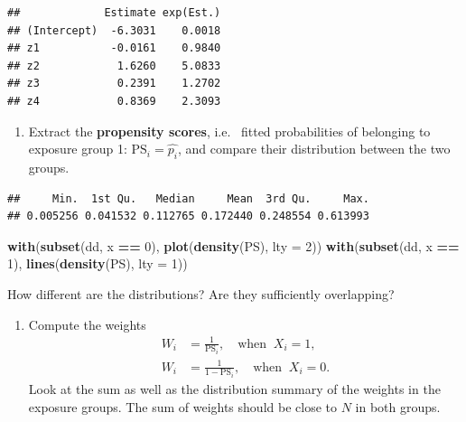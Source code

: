 \documentclass[
]{book}
\newenvironment{Shaded}{\begin{snugshade}}{\end{snugshade}}
\newcommand{\AttributeTok}[1]{\textcolor[rgb]{0.13,0.29,0.53}{#1}}
\newcommand{\DecValTok}[1]{\textcolor[rgb]{0.00,0.00,0.81}{#1}}
\newcommand{\FunctionTok}[1]{\textcolor[rgb]{0.13,0.29,0.53}{\textbf{#1}}}
\newcommand{\NormalTok}[1]{#1}
\newcommand{\OtherTok}[1]{\textcolor[rgb]{0.56,0.35,0.01}{#1}}
\newcommand{\SpecialCharTok}[1]{\textcolor[rgb]{0.81,0.36,0.00}{\textbf{#1}}}
\newcommand{\StringTok}[1]{\textcolor[rgb]{0.31,0.60,0.02}{#1}}
\providecommand{\tightlist}{%
  \setlength{\itemsep}{0pt}\setlength{\parskip}{0pt}}
\begin{document}
\begin{verbatim}
##             Estimate exp(Est.)
## (Intercept)  -6.3031    0.0018
## z1           -0.0161    0.9840
## z2            1.6260    5.0833
## z3            0.2391    1.2702
## z4            0.8369    2.3093
\end{verbatim}

\begin{enumerate}
\def\labelenumi{\arabic{enumi}.}
\setcounter{enumi}{1}
\tightlist
\item
  Extract the \textbf{propensity scores}, i.e.~
  fitted probabilities of
  belonging to exposure group 1:
  \(\text{PS}_i = \widehat{p_i}\), and
  compare their distribution between the two groups.
\end{enumerate}

\begin{Shaded}
\end{Shaded}

\begin{verbatim}
##     Min.  1st Qu.   Median     Mean  3rd Qu.     Max. 
## 0.005256 0.041532 0.112765 0.172440 0.248554 0.613993
\end{verbatim}

\begin{Shaded}
\begin{Highlighting}[]
\FunctionTok{with}\NormalTok{(}\FunctionTok{subset}\NormalTok{(dd, x }\SpecialCharTok{==} \DecValTok{0}\NormalTok{), }\FunctionTok{plot}\NormalTok{(}\FunctionTok{density}\NormalTok{(PS), }\AttributeTok{lty =} \DecValTok{2}\NormalTok{))}
\FunctionTok{with}\NormalTok{(}\FunctionTok{subset}\NormalTok{(dd, x }\SpecialCharTok{==} \DecValTok{1}\NormalTok{), }\FunctionTok{lines}\NormalTok{(}\FunctionTok{density}\NormalTok{(PS), }\AttributeTok{lty =} \DecValTok{1}\NormalTok{))}
\end{Highlighting}
\end{Shaded}

How different are the distributions? Are they sufficiently overlapping?

\begin{enumerate}
\def\labelenumi{\arabic{enumi}.}
\setcounter{enumi}{2}
\tightlist
\item
  Compute the weights
  \[
  \begin{aligned}
   W_i & = \frac{1}{\text{PS}_i}, \quad \text{when }\ X_i=1, \\
   W_i & = \frac{1}{1-\text{PS}_i}, \quad \text{when }\ X_i=0 . 
  \end{aligned} 
  \]
  Look at the sum as well as
  the distribution summary of the weights in the exposure groups. The
  sum of weights should be close to \(N\) in both groups.
\end{enumerate}
\end{document}
